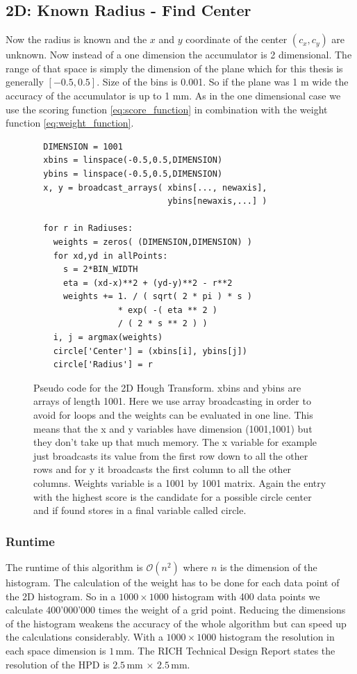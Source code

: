 \documentclass[10pt,twoside]{scrreprt}
\begin{document}
\subsection{2D: Known Radius - Find Center} %
\label{sub:2d_known_radius_find_center}
Now the radius is known and the $x$ and $y$ coordinate of the center $(c_x, c_y)$ are unknown. Now instead of a one dimension the accumulator is 2 dimensional. The range of that space is simply the dimension of the plane which for this thesis is generally $[-0.5,0.5]$. Size of the bins is 0.001. So if the plane was 1 m wide the accuracy of the accumulator is up to 1 mm. As in the one dimensional case we use the scoring function \ref{eq:score_function} in combination with the weight function \ref{eq:weight_function}.

\begin{figure}[b]
\begin{lstlisting}
  DIMENSION = 1001
  xbins = linspace(-0.5,0.5,DIMENSION)
  ybins = linspace(-0.5,0.5,DIMENSION)
  x, y = broadcast_arrays( xbins[..., newaxis], 
                           ybins[newaxis,...] )

  for r in Radiuses:
    weights = zeros( (DIMENSION,DIMENSION) )
    for xd,yd in allPoints:
      s = 2*BIN_WIDTH
      eta = (xd-x)**2 + (yd-y)**2 - r**2      
      weights += 1. / ( sqrt( 2 * pi ) * s ) 
                 * exp( -( eta ** 2 ) 
                 / ( 2 * s ** 2 ) )
    i, j = argmax(weights)
    circle['Center'] = (xbins[i], ybins[j])
    circle['Radius'] = r
\end{lstlisting}
  \caption{Pseudo code for the 2D Hough Transform. xbins and ybins are arrays of length 1001. Here we use array broadcasting in order to avoid for loops and the weights can be evaluated in one line. This means that the x and y variables have dimension (1001,1001) but they don't take up that much memory. The x variable for example just broadcasts its value from the first row down to all the other rows and for y it broadcasts the first column to all the other columns. Weights variable is a 1001 by 1001 matrix. Again the entry with the highest score is the candidate for a possible circle center and if found stores in a final variable called circle.}
\end{figure}

\subsubsection{Runtime} %
\label{ssub:runtime}
The runtime of this algorithm is $\mathcal{O}(n^2)$ where $n$ is the dimension of the histogram. The calculation of the weight has to be done for each data point of the 2D histogram. So in a $1000\times 1000$ histogram with 400 data points we calculate 400'000'000 times the weight of a grid point. Reducing the dimensions of the histogram weakens the accuracy of the whole algorithm but can speed up the calculations considerably. With a $1000\times 1000$ histogram the resolution in each space dimension is $1$\,mm. The RICH Technical Design Report states the resolution of the HPD is $2.5$\,mm $\times$ $2.5$\,mm.
\end{document}
